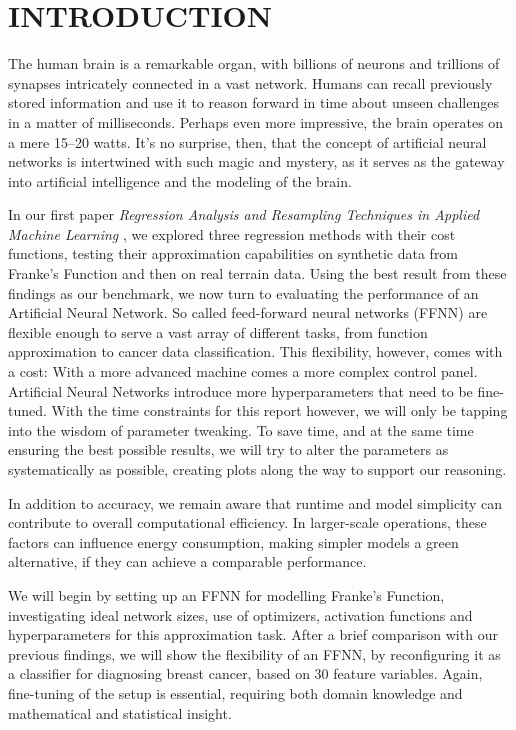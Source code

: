 \documentclass{article}
\begin{document}
\section*{INTRODUCTION}
\begin{multicols}{2}
The human brain is a remarkable organ, with billions of neurons and trillions of synapses intricately connected in a vast network. Humans can recall previously stored information and use it to reason forward in time about unseen challenges in a matter of milliseconds. Perhaps even more impressive, the brain operates on a mere 15–20 watts. \cite{fridman_yann_nodate} It’s no surprise, then, that the concept of artificial neural networks is intertwined with such magic and mystery, as it serves as the gateway into artificial intelligence and the modeling of the brain.

In our first paper \textit{Regression Analysis and Resampling Techniques in Applied Machine Learning} \cite{oa_brovold_eg_hansen_hg_kornstad_regression_2024}, we explored three regression methods with their cost functions, testing their approximation capabilities on synthetic data from Franke's Function \cite{franke_critical_1975} and then on real terrain data. Using the best result from these findings as our benchmark, we now turn to evaluating the performance of an Artificial Neural Network. So called feed-forward neural networks (FFNN) are flexible enough to serve a vast array of different tasks, from function approximation to cancer data classification. This flexibility, however, comes with a cost: With a more advanced machine comes a more complex control panel. Artificial Neural Networks introduce more hyperparameters that need to be fine-tuned. With the time constraints for this report however, we will only be tapping into the wisdom of parameter tweaking. To save time, and at the same time ensuring the best possible results, we will try to alter the parameters as systematically as possible, creating plots along the way to support our reasoning.

In addition to accuracy, we remain aware that runtime and model simplicity can contribute to overall computational efficiency. In larger-scale operations, these factors can influence energy consumption, making simpler models a green alternative, if they can achieve a comparable performance. 

We will begin by setting up an FFNN for modelling Franke's Function, investigating ideal network sizes, use of optimizers, activation functions and hyperparameters for this approximation task. After a brief comparison with our previous findings, we will show the flexibility of an FFNN, by reconfiguring it as a classifier for diagnosing breast cancer, based on 30 feature variables. Again, fine-tuning of the setup is essential, requiring both domain knowledge and mathematical and statistical insight. 


\end{multicols}
\end{document}
